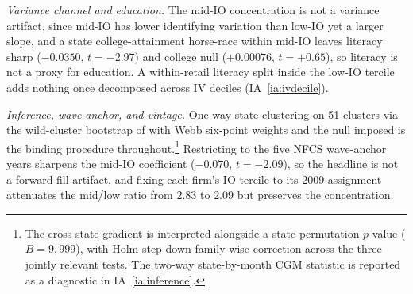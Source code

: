 \textit{Variance channel and education.} The mid-IO concentration is not a variance artifact, since mid-IO has lower identifying variation than low-IO yet a larger slope, and a state college-attainment horse-race within mid-IO leaves literacy sharp ($-0.0350$, $t = -2.97$) and college null ($+0.00076$, $t = +0.65$), so literacy is not a proxy for education. A within-retail literacy split inside the low-IO tercile adds nothing once decomposed across IV deciles (IA~\ref{ia:ivdecile}).

\textit{Inference, wave-anchor, and vintage.} One-way state clustering on 51 clusters via the wild-cluster bootstrap of \citet{cameronGelbachMiller2008} with Webb six-point weights \citep{webb2014} and the null imposed is the binding procedure throughout.\footnote{The cross-state gradient is interpreted alongside a state-permutation $p$-value ($B = 9{,}999$), with Holm step-down family-wise correction across the three jointly relevant tests. The two-way state-by-month CGM statistic is reported as a diagnostic in IA~\ref{ia:inference}.} Restricting to the five NFCS wave-anchor years sharpens the mid-IO coefficient ($-0.070$, $t = -2.09$), so the headline is not a forward-fill artifact, and fixing each firm's IO tercile to its 2009 assignment attenuates the mid/low ratio from $2.83$ to $2.09$ but preserves the concentration.
